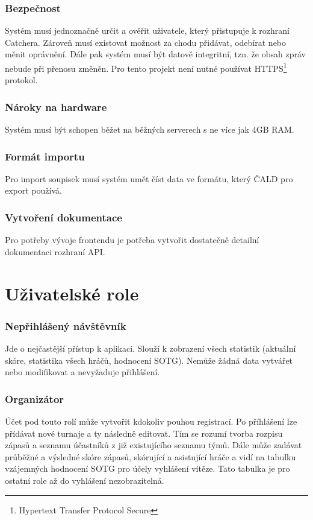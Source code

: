 \subsubsection*{Bezpečnost}
Systém musí jednoznačně určit a ověřit uživatele, který přistupuje k rozhraní Catchera. Zároveň
musí existovat možnost za chodu přidávat, odebírat nebo měnit oprávnění. Dále pak systém musí
být datově integritní, tzn. že obsah zpráv nebude při přenosu změněn. Pro tento projekt není
nutné používat HTTPS\footnote{Hypertext Transfer Protocol Secure} protokol.

\subsubsection*{Nároky na hardware}
Systém musí být schopen běžet na běžných serverech s ne více jak 4GB RAM.

\subsubsection*{Formát importu}
Pro import soupisek musí systém umět číst data ve formátu, který ČALD pro export používá.

\subsubsection*{Vytvoření dokumentace}
Pro potřeby vývoje frontendu je potřeba vytvořit dostatečně detailní dokumentaci rozhraní API.

\section{Uživatelské role}

\subsubsection*{Nepřihlášený návštěvník}

Jde o nejčastější přístup k aplikaci. Slouží k zobrazení všech statistik (aktuální skóre,
statistika všech hráčů, hodnocení SOTG). Nemůže žádná data vytvářet nebo modifikovat
a nevyžaduje přihlášení.
  
\subsubsection*{Organizátor}

Účet pod touto rolí může vytvořit kdokoliv pouhou registrací. Po příhlášení lze přídávat
nové turnaje a ty následně editovat. Tím se rozumí tvorba rozpisu zápasů a seznamu účastníků
z již existujícího seznamu týmů. Dále může zadávat průběžné a výsledné skóre zápasů,
skórující a asistující hráče a vidí na tabulku vzájemných hodnocení SOTG pro účely vyhlášení
vítěze. Tato tabulka je pro ostatní role až do vyhlášení nezobrazitelná.

